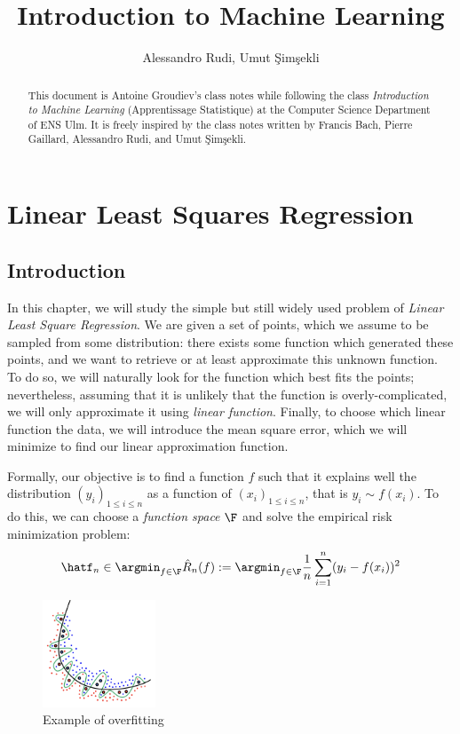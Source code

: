 \documentclass[toc, titlepaged]{../cs-classes/cs-classes}
\title{Introduction to Machine Learning}
\author{Alessandro Rudi, Umut \c{S}im\c{s}ekli}
\begin{document}
\begin{abstract}
    This document is Antoine Groudiev's class notes while following the class \emph{Introduction to Machine Learning} (Apprentissage Statistique) at the Computer Science Department of ENS Ulm. It is freely inspired by the class notes written by Francis Bach, Pierre Gaillard, Alessandro Rudi, and Umut \c{S}im\c{s}ekli. 
\end{abstract}

\section{Linear Least Squares Regression}
\subsection{Introduction}
In this chapter, we will study the simple but still widely used problem of \emph{Linear Least Square Regression}. We are given a set of points, which we assume to be sampled from some distribution: there exists some function which generated these points, and we want to retrieve or at least approximate this unknown function. To do so, we will naturally look for the function which best fits the points; nevertheless, assuming that it is unlikely that the function is overly-complicated, we will only approximate it using \emph{linear function}. Finally, to choose which linear function  the data, we will introduce the mean square error, which we will minimize to find our linear approximation function.

Formally, our objective is to find a function $f$ such that it explains well the distribution $(y_i)_{1\leq i\leq n}$ as a function of $(x_i)_{1\leq i\leq n}$, that is $y_i\sim f(x_i)$. To do this, we can choose a \emph{function space} $\F$ and solve the empirical risk minimization problem:
\begin{equation*}
    \hatf_n \in \argmin_{f\in\F} \hat{R}_n(f) := \argmin_{f\in\F} \frac{1}{n}\sum_{i=1}^n (y_i-f(x_i))^2
\end{equation*}
\begin{figure}
    \includegraphics[width=0.3\textwidth]{images/overfitting.png}
    \caption{Example of overfitting}
\end{figure}
\end{document}
